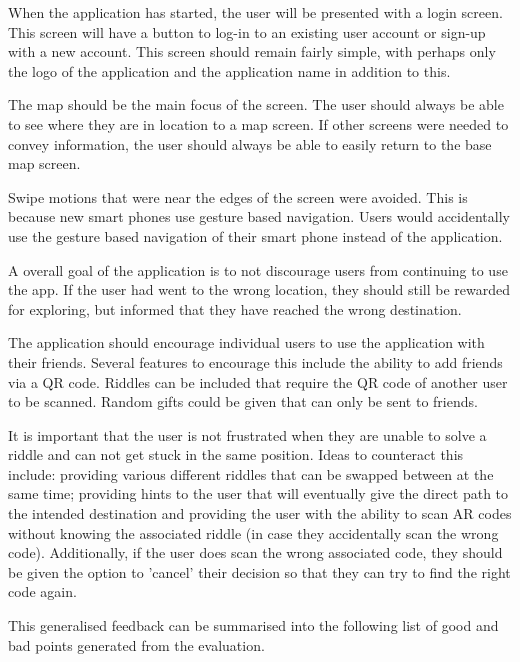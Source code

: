 \documentclass[10pt,twocolumn]{article} %
\begin{document}
When the application has started, the user will be presented with a login screen. This screen will have a button to log-in to an existing user account or sign-up with a new account. This screen should remain fairly simple, with perhaps only the logo of the application and the application name in addition to this.

The map should be the main focus of the screen. The user should always be able to see where they are in location to a map screen. If other screens were needed to convey information, the user should always be able to easily return to the base map screen.

Swipe motions that were near the edges of the screen were avoided. This is because new smart phones use gesture based navigation. Users would accidentally use the gesture based navigation of their smart phone instead of the application.

A overall goal of the application is to not discourage users from continuing to use the app. If the user had went to the wrong location, they should still be rewarded for exploring, but informed that they have reached the wrong destination.

The application should encourage individual users to use the application with their friends. Several features to encourage this include the ability to add friends via a QR code. Riddles can be included that require the QR code of another user to be scanned. Random gifts could be given that can only be sent to friends.

It is important that the user is not frustrated when they are unable to solve a riddle and can not get stuck in the same position. Ideas to counteract this include: providing various different riddles that can be swapped between at the same time; providing hints to the user that will eventually give the direct path to the intended destination and providing the user with the ability to scan AR codes without knowing the associated riddle (in case they accidentally scan the wrong code). Additionally, if the user does scan the wrong associated code, they should be given the option to 'cancel' their decision so that they can try to find the right code again.

This generalised feedback can be summarised into the following list of good and bad points generated from the evaluation.
\end{document}
